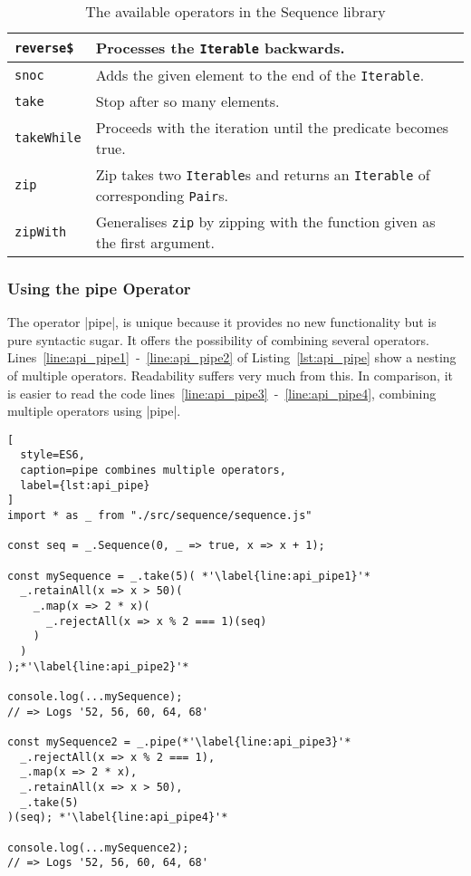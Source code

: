 \begin{table}[H]
\begin{tabularx}{\textwidth}{| l | X |}
    \texttt{reverse\$} & Processes the \texttt{Iterable} backwards. \\ \hline 
    \texttt{snoc} & Adds the given element to the end of the \texttt{Iterable}. \\ \hline 
    \texttt{take} & Stop after so many elements. \\ \hline 
    \texttt{takeWhile} & Proceeds with the iteration until the predicate becomes true. \\ \hline 
    \texttt{zip} & Zip takes two \texttt{Iterable}s and returns an \texttt{Iterable} of corresponding \texttt{Pair}s. \\ \hline 
    \texttt{zipWith} & Generalises \texttt{zip} by zipping with the function given as the first argument. \\ \hline 
  \end{tabularx}
  \caption{The available operators in the Sequence library}
  \label{tab:api_operators}
\end{table}

\subsubsection{Using the pipe Operator} %
\label{subsub:Using the pipe Operator}
The operator |pipe|, is unique because it provides no new functionality but is
pure syntactic sugar. It offers the possibility of combining several operators.
Lines~\ref{line:api_pipe1}~-~\ref{line:api_pipe2} of Listing~\ref{lst:api_pipe}
show a nesting of multiple operators. Readability suffers very much from this.
In comparison, it is easier to read the code
lines~\ref{line:api_pipe3}~-~\ref{line:api_pipe4}, combining multiple operators
using |pipe|. 
\begin{lstlisting}[
  style=ES6,
  caption=pipe combines multiple operators,
  label={lst:api_pipe}
]
import * as _ from "./src/sequence/sequence.js"

const seq = _.Sequence(0, _ => true, x => x + 1);

const mySequence = _.take(5)( *'\label{line:api_pipe1}'*
  _.retainAll(x => x > 50)(
    _.map(x => 2 * x)(
      _.rejectAll(x => x % 2 === 1)(seq)
    )
  )
);*'\label{line:api_pipe2}'*

console.log(...mySequence);
// => Logs '52, 56, 60, 64, 68'

const mySequence2 = _.pipe(*'\label{line:api_pipe3}'*
  _.rejectAll(x => x % 2 === 1),
  _.map(x => 2 * x),
  _.retainAll(x => x > 50),
  _.take(5)
)(seq); *'\label{line:api_pipe4}'*

console.log(...mySequence2);
// => Logs '52, 56, 60, 64, 68'
\end{lstlisting}

